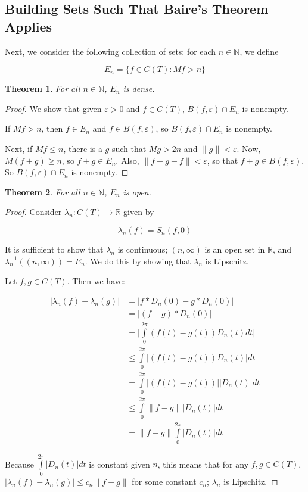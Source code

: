 \documentclass{amsart}
\newcommand{\vep}{\varepsilon}
\newcommand{\la}{\lambda}
\newcommand{\N}{\mathbb{N}}
\newcommand{\R}{\mathbb{R}}
\newcommand{\absval}[1]{\lvert #1 \rvert}
\newcommand{\norm}[1]{\|#1\|}
\newtheorem{thm}{Theorem}[section]
\theoremstyle{definition}
\begin{document}
\subsection{Building Sets Such That Baire's Theorem Applies}

Next, we consider the following collection of sets: for each $n \in \N$, we define

\begin{displaymath}
E_n = \{f \in C(T) : Mf > n\}
\end{displaymath}

\begin{thm}
For all $n \in \N$, $E_n$ is dense.
\end{thm}

\begin{proof}

We show that given $\vep>0$ and $f \in C(T)$, $B(f,\vep) \cap E_n$ is nonempty. 

If $Mf > n$, then $f \in E_n$ and $f \in B(f, \vep)$, so $B(f, \vep) \cap E_n$ is nonempty.

Next, if $Mf \leq n$, there is a $g$ such that $Mg > 2n$ and $\norm{g} < \vep$. 
Now, $M(f+g) \geq n$, so $f+g \in E_n$. 
Also, $\norm{f+g -f} < \vep$, so that $f+g \in B(f, \vep)$. 
So $B(f, \vep) \cap E_n$ is nonempty.

\end{proof}

\begin{thm}
For all $n \in \N$, $E_n$ is open.
\end{thm}

\begin{proof}
Consider $\la_n: C(T) \to \R$ given by

\begin{displaymath}
\la_n(f) = S_n(f,0)
\end{displaymath}

It is sufficient to show that $\la_n$ is continuous; $(n, \infty)$ is an open set in $\R$, and $\la_n^{-1}((n, \infty)) = E_n$. 
We do this by showing that $\la_n$ is Lipschitz.

Let $f, g \in C(T)$. Then we have:

\begin{align*}
\absval{\la_n(f) - \la_n(g)} &= \absval{f \ast D_n(0) - g \ast D_n(0)} \\
&= \absval{(f-g) \ast D_n(0)} \\
&= \absval{\int\limits_0^{2\pi} (f(t)-g(t))D_n(t)dt} \\
&\leq \int\limits_0^{2\pi} \absval{(f(t)-g(t))D_n(t)}dt \\
&= \int\limits_0^{2\pi} \absval{(f(t)-g(t))}\absval{D_n(t)}dt \\
&\leq \int\limits_0^{2\pi} \norm{f-g}\absval{D_n(t)}dt \\
&= \norm{f-g} \int\limits_0^{2\pi} \absval{D_n(t)}dt
\end{align*}

Because $\int\limits_0^{2\pi} \absval{D_n(t)}dt$ is constant given $n$, this means that for any $f,g \in C(T)$, $\absval{\la_n(f) - \la_n(g)} \leq c_n \norm{f-g}$ for some constant $c_n$; $\la_n$ is Lipschitz.

\end{proof}
\end{document}

